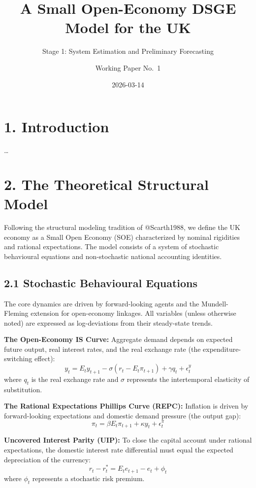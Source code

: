 \documentclass[
  letterpaper,
  DIV=11,
  numbers=noendperiod]{scrartcl}
\title{A Small Open-Economy DSGE Model for the UK}
\subtitle{Stage 1: System Estimation and Preliminary Forecasting}
\author{Working Paper No.~1}
\date{2026-03-14}
\renewcommand*\contentsname{Table of contents}
\newcommand\contentsname{Table of contents}
\begin{document}
\maketitle

\renewcommand*\contentsname{Table of contents}
{
\hypersetup{linkcolor=}
\setcounter{tocdepth}{3}
\tableofcontents
}

\section{1. Introduction}\label{introduction}

\ldots{}

\section{2. The Theoretical Structural
Model}\label{the-theoretical-structural-model}

Following the structural modeling tradition of @Scarth1988, we define
the UK economy as a Small Open Economy (SOE) characterized by nominal
rigidities and rational expectations. The model consists of a system of
stochastic behavioural equations and non-stochastic national accounting
identities.

\subsection{2.1 Stochastic Behavioural
Equations}\label{stochastic-behavioural-equations}

The core dynamics are driven by forward-looking agents and the
Mundell-Fleming extension for open-economy linkages. All variables
(unless otherwise noted) are expressed as log-deviations from their
steady-state trends.

\textbf{The Open-Economy IS Curve:} Aggregate demand depends on expected
future output, real interest rates, and the real exchange rate (the
expenditure-switching effect):
\[y_t = E_t y_{t+1} - \sigma(r_t - E_t \pi_{t+1}) + \gamma q_t + \epsilon^y_t\]
where \(q_t\) is the real exchange rate and \(\sigma\) represents the
intertemporal elasticity of substitution.

\textbf{The Rational Expectations Phillips Curve (REPC):} Inflation is
driven by forward-looking expectations and domestic demand pressure (the
output gap):
\[\pi_t = \beta E_t \pi_{t+1} + \kappa y_t + \epsilon^\pi_t\]

\textbf{Uncovered Interest Parity (UIP):} To close the capital account
under rational expectations, the domestic interest rate differential
must equal the expected depreciation of the currency:
\[r_t - r^*_t = E_t e_{t+1} - e_t + \phi_t\] where \(\phi_t\) represents
a stochastic risk premium.
\end{document}
